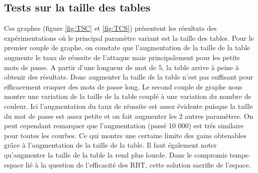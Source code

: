 \documentclass[french,12pt]{article}
\begin{document}
    \subsection{Tests sur la taille des tables}
    
     Ces graphes (figure \ref{fig:TSC} et \ref{fig:TCS}) présentent les résultats des expérimentations où le principal paramètre variant est la taille des tables. Pour le premier couple de graphe, on constate que l'augmentation de la taille de la table augmente le taux de réussite de l'attaque mais principalement pour les petits mots de passe. A partir d'une longueur de mot de 5, la table arrive à peine à obtenir des résultats. Donc augmenter la taille de la table n'est pas suffisant pour efficacement craquer des mots de passe long. Le second couple de graphe nous montre une variation de la taille de la table couplé à une variation du nombre de couleur. Ici l'augmentation du taux de réussite est assez évidente puisque la taille du mot de passe est assez petite et on fait augmenter les 2 autres paramètres. On peut cependant remarquer que l'augmentation (passé 10 000) est très similaire pour toutes les courbes. Ce qui montre une certaine limite des gains obtenables grâce à l'augmentation de la taille de la table. Il faut également noter qu'augmenter la taille de la table la rend plus lourde. Dans le compromis temps-espace lié à la question de l'efficacité des RBT, cette solution sacrifie de l'espace.
    
\end{document}
